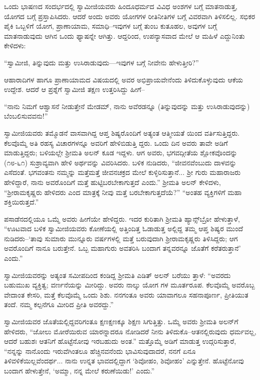 ಒಂದು ಭಾಷಣದ ಸಂದರ್ಭದಲ್ಲಿ ಸ್ವಾಮೀಜಿಯವರು ಹಿಂದೂಧರ್ಮದ ವಿವಿಧ ಅಂಶಗಳ ಬಗ್ಗೆ ಮಾತನಾಡುತ್ತ, ಯೋಗದ ಬಗ್ಗೆ ಪ್ರಸ್ತಾಪಿಸಿದರು. ಆದರೆ ಅಂದು ಅವರು ಯೋಗಗಳ ರೀತಿನೀತಿಗಳ ಬಗ್ಗೆ ವಿವರವಾಗಿ ತಿಳಿಸಲಿಲ್ಲ. ಸಭಿಕರ ಪೈಕಿ ಒಬ್ಬಳಿಗೆ ಯೋಗ, ಪ್ರಾಣಾಯಾಮ, ಸಮಾಧಿ–ಇವುಗಳ ಬಗ್ಗೆ ತುಂಬ ಕುತೂಹಲ, ಅವುಗಳ ಬಗ್ಗೆ ಮಾತನಾಡುವುದು ಆಗಿನ ಒಂದು ಫ್ಯಾಷನ್ನೇ ಆಗಿತ್ತು. ಆದ್ದರಿಂದ, ಉಪನ್ಯಾಸವಾದ ಮೇಲೆ ಆ ಮಹಿಳೆ ಎದ್ದುನಿಂತು ಕೇಳಿದಳು:

“ಸ್ವಾಮೀಜಿ, ತಿನ್ನುವುದು ಮತ್ತು ಉಸಿರಾಡುವುದು—ಇವುಗಳ ಬಗ್ಗೆ ನೀವೇನು ಹೇಳುತ್ತೀರಿ?”

ಆಹಾರಾದಿಗಳ ಹಾಗೂ ಪ್ರಾಣಾಯಾಮದ ವಿಷಯದಲ್ಲಿ ಅವರ ಅಭಿಪ್ರಾಯವೇನೆಂದು ತಿಳಿದುಕೊಳ್ಳುವುದು ಆಕೆಯ ಉದ್ದೇಶ. ಆದರೆ ಆ ಪ್ರಶ್ನೆಗೆ ಸ್ವಾಮೀಜಿ ತಕ್ಷಣ ಉತ್ತರಿಸಿದ್ದು ಹೀಗೆ–

“ನಾನು ನಿಮಗೆ ಆಶ್ವಾಸನೆ ನೀಡುತ್ತೇನೆ ಮೇಡಮ್, ನಾನು ಅವೆರಡನ್ನೂ (ತಿನ್ನುವುದನ್ನು ಮತ್ತು ಉಸಿರಾಡುವುದನ್ನು) ಬೆಂಬಲಿಸುವವನು!”

ಸ್ವಾಮೀಜಿಯವರು ತಮ್ಮೊಡನೆ ವಾಸವಾಗಿದ್ದ ಆಪ್ತ ಶಿಷ್ಯರೊಂದಿಗೆ ಅತ್ಯಂತ ಆತ್ಮೀಯತೆ ಯಿಂದ ವರ್ತಿಸುತ್ತಿದ್ದರು. ಕೆಲವೊಮ್ಮೆ ಅತಿ ರಹಸ್ಯ ವಿಚಾರಗಳನ್ನೂ ಅವರಿಗೆ ಹೇಳಿಬಿಡುತ್ತಿ ದ್ದರು. ಒಂದು ದಿನ ಅವರು ತಾವೇ ಅಡಿಗೆ ಮಾಡುತ್ತಿದ್ದರು; ಬಳಿಯಲ್ಲೇ ಶ್ರೀಮತಿ ಅಲನ್ ಕೂಡ ಇದ್ದಳು. ಆಗ ಅವರು, ಭಗವದ್ಗೀತೆಯ ಶ್ಲೋಕವೊಂದನ್ನು (೧೮-೬೧) ಸುಶ್ರಾವ್ಯವಾಗಿ ಹೇಳಿ ಅರ್ಥವನ್ನು ವಿವರಿಸಿದರು. ಬಳಿಕ ನುಡಿದರು, “ಜೀವನವೆಂಬುದು ದಾಳವನ್ನು ಎಸೆದಂತೆ. ಭಗವಂತನು ನಮ್ಮನ್ನು ಮತ್ತೆಮತ್ತೆ ಜೀವನಚಕ್ರದ ಮೇಲೆ ಕುಳ್ಳಿರಿಸುತ್ತಾನೆ... ಶ್ರೀ ಗುರು ಮಹಾರಾಜರು ಹೇಳಿದ್ದಾರೆ, ನಾನು ಅವರೊಂದಿಗೆ ಮತ್ತೆ ಹುಟ್ಟಿಬರಬೇಕಾಗುತ್ತದೆ ಎಂದು.” ಶ್ರೀಮತಿ ಅಲನ್ ಕೇಳಿದಳು, “ಶ್ರೀರಾಮಕೃಷ್ಣರು ಹೇಳಿದರು ಎಂದ ಮಾತ್ರಕ್ಕೆ ನೀವು ಮತ್ತೆ ಬರಬೇಕಾಗುತ್ತದೆಯೆ?” “ಅಂತಹ ವ್ಯಕ್ತಿಗಳಿಗೆ ಮಹಾ ಶಕ್ತಿಯಿರುತ್ತದೆ.”

ಪಸಾಡೆನದಲ್ಲಿಯೂ ಒಮ್ಮೆ ಅವರು ಹೀಗೆಯೇ ಹೇಳಿದ್ದರು. ಇದರ ಕುರಿತಾಗಿ ಶ್ರೀಮತಿ ಹ್ಯಾನ್ಸ್​ಬ್ರೋ ಹೇಳುತ್ತಾಳೆ, “ಊಟವಾದ ಬಳಿಕ ಸ್ವಾಮೀಜಿಯವರು ಕೋಣೆಯಲ್ಲಿ ಅತ್ತಿಂದಿತ್ತ ಓಡಾಡುತ್ತ ಅಲ್ಲಿದ್ದ ತಮ್ಮ ಆಪ್ತ ಶಿಷ್ಯರ ಮುಂದೆ ನುಡಿದರು–‘ತಾವು ಸುಮಾರು ಮುನ್ನೂರು ವರ್ಷಗಳಲ್ಲಿ ಮತ್ತೆ ಬರುವುದಾಗಿ ಶ್ರೀರಾಮಕೃಷ್ಣರು ತಿಳಿಸಿದ್ದರು; ಆಗ ಅವರೊಂದಿಗೆ ನಾನೂ ಬರುತ್ತೇನೆ. ಒಬ್ಬ ಮಹಾಗುರು ಅವತರಿಸಿ ಬಂದಾಗ ತನ್ನವರನ್ನೂ ಜೊತೆಗೆ ಕರೆತರುತ್ತಾನೆ’ ಎಂದು.”

ಸ್ವಾಮೀಜಿಯವರನ್ನು ಅತ್ಯಂತ ಸಮೀಪದಿಂದ ಕಂಡಿದ್ದ ಶ್ರೀಮತಿ ಎಡಿತ್ ಅಲನ್ ಬರೆಯು ತ್ತಾಳೆ: “ಅವರದು ಬಹುಮುಖ ವ್ಯಕ್ತಿತ್ವ; ವರ್ಣನೆಯನ್ನು ಮೀರಿದ್ದು. ಅವರು ನಾಲ್ಕು ಯೋಗ ಗಳ ಮೂರ್ತರೂಪ. ಕೆಲವೊಮ್ಮೆ ಅವರೊಬ್ಬ ವೇದಾಂತ ಕೇಸರಿ, ಮತ್ತೆ ಕೆಲವೊಮ್ಮೆ ಒಂದು ಶಿಶು. ನನಗಂತೂ ಅವರು ಯಾವಾಗಲೂ ಸಹನಾಪೂರ್ಣ, ಪ್ರೀತಿಯುತ ತಂದೆ. ನಮ್ಮ ಕಲ್ಪನೆಗೂ ಮೀರಿದ ಪ್ರೀತಿ ಅವರದ್ದು.”

ಸ್ವಾಮೀಜಿಯವರ ಜೊತೆಯಲ್ಲಿದ್ದವರಿಗಂತೂ ಕ್ಷಣಕ್ಷಣಕ್ಕೂ ಶಿಕ್ಷಣ ಸಿಗುತ್ತಿತ್ತು. ಒಮ್ಮೆ ಅವರು ಶ್ರೀಮತಿ ಅಲನ್​ಗೆ ಹೇಳಿದರು, “ಜೋಲು ಮೋರೆಯಿರುವ ಯಾರನ್ನಾದರೂ ನೋಡಿದರೆ ನೀನು ತಿಳಿದುಕೊ–ಆತನಲ್ಲಿರುವುದು ಧರ್ಮವಲ್ಲ, ಆದರೆ ಬಹುಶಃ ಆತನಿಗೆ ಹೊಟ್ಟೆನೋವು ಇರಬಹುದು ಅಂತ.” ಮತ್ತೊಮ್ಮೆ ಅಡಿಗೆ ಮಾಡುತ್ತ ಉದ್ಗರಿಸುತ್ತಾರೆ, “ನನ್ನನ್ನು ನಾನೊಂದು ಇರುವೆಗಿಂತಲೂ ಹೆಚ್ಚಿನವನೆಂದು ಭಾವಿಸುವುದಾದರೆ, ನನಗೆ ಏನೂ ತಿಳಿವಳಿಕೆಯಿಲ್ಲವೆಂದರ್ಥ... ನಾನು ಉನ್ನತ ಭಾವದಲ್ಲಿದ್ದಾಗ ‘ಶಿವೋಹಂ, ಶಿವೋಹಂ’ ಎನ್ನುತ್ತೇನೆ. ಹೊಟ್ಟೆನೋವು ಬಂದಾಗ ಹೇಳುತ್ತೇನೆ, ‘ಅಮ್ಮಾ, ನನ್ನ ಮೇಲೆ ಕರುಣೆಯಿಡು!’ ಎಂದು.”

